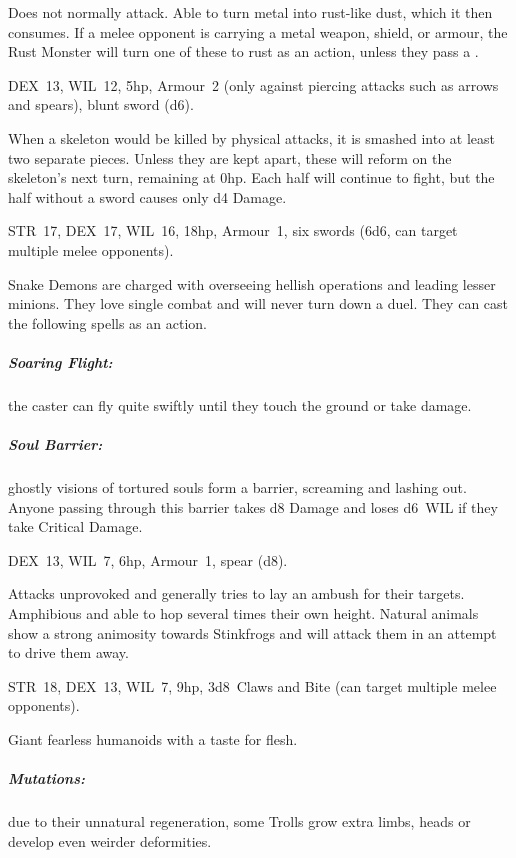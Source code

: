 \documentclass[itdr]{subfiles}
\begin{document}
Does not normally attack. Able to turn metal into rust-like dust, which it then consumes. If a melee opponent is carrying a metal weapon, shield, or armour, the Rust Monster will turn one of these to rust as an action, unless they pass a .

\vfill

DEX~13, WIL~12, 5hp, Armour~2 (only against piercing attacks such as arrows and spears), blunt sword (d6).

When a skeleton would be killed by physical attacks, it is smashed into at least two separate pieces. Unless they are kept apart, these will reform on the skeleton's next turn, remaining at 0hp. Each half will continue to fight, but the half without a sword causes only d4 Damage.

\vfill

\vspace{-1em}
STR~17, DEX~17, WIL~16, 18hp, Armour~1, six swords (6d6, can target multiple melee opponents).

\vspace{1em}

\break
Snake Demons are charged with overseeing hellish operations and leading lesser minions. They love single combat and will never turn down a duel. They can cast the following spells as an action.

\subparagraph{Soaring Flight:} the caster can fly quite swiftly until they touch the ground or take damage.

\subparagraph{Soul Barrier:} ghostly visions of tortured souls form a barrier, screaming and lashing out. Anyone passing through this barrier takes d8 Damage and loses d6~WIL if they take Critical Damage.

\vfill

DEX~13, WIL~7, 6hp, Armour~1, spear (d8).

Attacks unprovoked and generally tries to lay an ambush for their targets. Amphibious and able to hop several times their own height. Natural animals show a strong animosity towards Stinkfrogs and will attack them in an attempt to drive them away.

\vfill

STR~18, DEX~13, WIL~7, 9hp, 3d8~Claws and Bite (can target multiple melee opponents).

Giant fearless humanoids with a taste for flesh.

\subparagraph{Mutations:} due to their unnatural regeneration, some Trolls grow extra limbs, heads or develop even weirder deformities.
\end{document}
